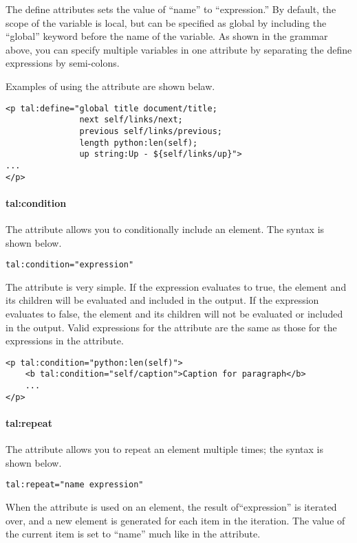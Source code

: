 The define attributes sets the value of ``name'' to ``expression.''
By default, the scope of the variable is local, but can be specified
as global by including the ``global'' keyword before the name of the
variable.  As shown in the grammar above, you can specify multiple
variables in one  attribute by separating the define
expressions by semi-colons.

Examples of using the  attribute are shown belaw.
\begin{verbatim}
<p tal:define="global title document/title;
               next self/links/next;
               previous self/links/previous;
               length python:len(self);
               up string:Up - ${self/links/up}">
...
</p>
\end{verbatim}


\paragraph{tal:condition}

The  attribute allows you to conditionally include
an element.  The syntax is shown below.
\begin{verbatim}
tal:condition="expression"
\end{verbatim}

The  attribute is very simple.  If the expression
evaluates to true, the element and its children will be evaluated and
included in the output.  If the expression evaluates to false, the element
and its children will not be evaluated or included in the output.
Valid expressions for the  attribute are the same
as those for the expressions in the  attribute.
\begin{verbatim}
<p tal:condition="python:len(self)">
    <b tal:condition="self/caption">Caption for paragraph</b>
    ...
</p>
\end{verbatim}


\paragraph{tal:repeat\label{sec:talrepeat}}

The  attribute allows you to repeat an element multiple
times; the syntax is shown below.
\begin{verbatim}
tal:repeat="name expression"
\end{verbatim}

When the  attribute is used on an element, the
result of``expression'' is iterated over, and a new element is generated
for each item in the iteration.  The value of the current item is
set to ``name'' much like in the  attribute.

